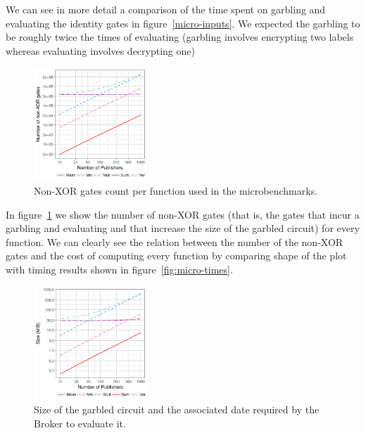 We can see in more detail a comparison of the time spent on garbling and
evaluating the identity gates in figure~\ref{micro-inputs}.  We expected the
garbling to be roughly twice the times of evaluating (garbling involves
encrypting two labels whereas evaluating involves decrypting one)

\begin{figure}
  \includegraphics[width=0.38\textwidth]{plots/nonxor_gates_log.png}
  \caption{Non-XOR gates count per function used in the microbenchmarks.}
  \label{micro-nonxor}
\end{figure}

In figure~\ref{micro-nonxor} we show the number of non-XOR gates (that is, the gates that
incur a garbling and evaluating and that increase the size of the garbled
circuit) for every function.  We can clearly see the relation between the
number of the non-XOR gates and the cost of computing every function by
comparing shape of the plot with timing results shown in
figure~\ref{fig:micro-times}.

\begin{figure}
  \includegraphics[width=0.38\textwidth]{plots/size_log.png}
  \caption{Size of the garbled circuit and the associated date required by the
    Broker to evaluate it.}
  \label{micro-sizes}
\end{figure}

